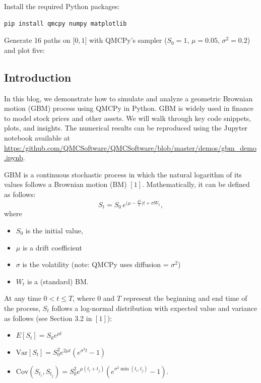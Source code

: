 
\begin{tcolorbox}[title=Quick Start,colback=blue!1,colframe=blue!30!black,breakable]
Install the required Python packages:
%
\begin{lstlisting}[language=bash,basicstyle=\ttfamily,frame=none,numbers=none]
    pip install qmcpy numpy matplotlib
\end{lstlisting}

Generate 16 paths on $\lbrack 0,1\rbrack$ with QMCPy's sampler  ($S_0=1$, $\mu=0.05$, $\sigma^2=0.2$) and plot five:
%

\end{tcolorbox}


\subsection{Introduction}

In this blog, we demonstrate how to simulate and analyze a geometric Brownian motion (GBM) process using QMCPy in Python.
GBM is widely used in finance to model stock prices and other assets. 
We will walk through key code snippets, plots, and insights. The numerical results can be reproduced using the Jupyter notebook available at \href{gbm\_demo.ipynb}{\url{https:/github.com/QMCSoftware/QMCSoftware/blob/master/demos/gbm\_demo.ipynb}}.

GBM is a continuous stochastic process in which the natural logarithm of its values follows a Brownian motion (BM) $[1]$.
Mathematically, it can be defined as follows:
\begin{equation}
S_t = S_0 \, e^{\bigl(\mu - \tfrac{\sigma^2}{2}\bigr)  t + \sigma W_t}, \label{gbm}
\end{equation}
where
\begin{itemize}
\item $S_0$ is the initial value, 
\item $\mu$ is a drift coefficient
\item $\sigma$ is the volatility (note: QMCPy uses diffusion = $\sigma^2$)
\item $W_t$ is a (standard) BM.
\end{itemize}

At any time $0 < t \le T$, where $0$ and $T$ represent the beginning and end time of the process, $S_t$ follows a log-normal distribution with expected value and variance as follows (see Section 3.2 in $[1]$):
\begin{itemize}
\item
 $E[S_t] = S_0 e^{\mu t}$
\item $\text{Var}[S_t] = S_0^2 e^{2\mu t}(e^{\sigma^2 t} - 1)$
\item   $  
    \text{Cov}(S_{t_i}, S_{t_j}) = S_0^2 e^{\mu(t_i + t_j)} \left(e^{\sigma^2 \min(t_i, t_j)} - 1\right).$
\end{itemize}


